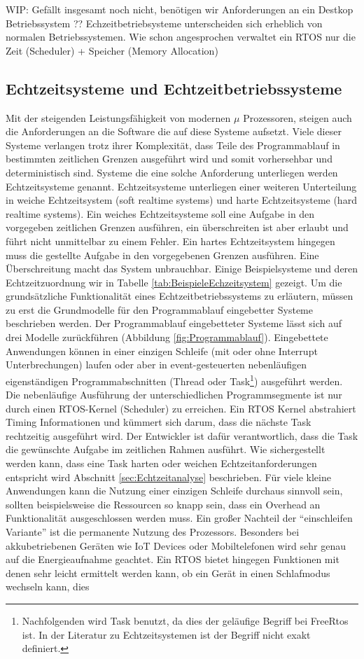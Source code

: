 \documentclass[ngerman]{seminarvorlage}
\begin{document}
WIP: Gefällt insgesamt noch nicht, benötigen wir Anforderungen an ein Destkop Betriebssystem ?? Echzeitbetriebsysteme unterscheiden sich erheblich von normalen Betriebssystemen. Wie schon angesprochen verwaltet ein RTOS nur die Zeit (Scheduler) + Speicher (Memory Allocation) 

\subsection{Echtzeitsysteme und Echtzeitbetriebssysteme}
Mit der steigenden Leistungsfähigkeit von modernen $\mu$ Prozessoren, steigen auch die Anforderungen an die Software die auf diese Systeme aufsetzt. Viele dieser Systeme verlangen trotz ihrer Komplexität, dass Teile des Programmablauf in bestimmten zeitlichen Grenzen ausgeführt wird und somit vorhersehbar und deterministisch sind. Systeme die eine solche Anforderung unterliegen werden Echtzeitsysteme genannt. Echtzeitsysteme unterliegen einer weiteren Unterteilung in weiche Echtzeitsystem (soft realtime systems) und harte Echtzeitsysteme (hard realtime systems). Ein weiches Echtzeitsysteme soll eine Aufgabe in den vorgegeben zeitlichen Grenzen ausführen, ein über\-schreiten ist aber erlaubt und führt nicht unmittelbar zu einem Fehler. Ein hartes Echtzeitsystem hingegen muss die gestellte Aufgabe in den vorgegebenen Grenzen ausführen. Eine Überschreitung macht das System unbrauchbar. Einige Beispielsysteme und deren Echtzeitzuordnung wir in Tabelle \ref{tab:BeispieleEchzeitsystem} gezeigt. Um die grundsätzliche Funktionalität eines Echtzeitbetriebssystems zu erläutern, müssen zu erst die Grundmodelle für den Programmablauf eingebetter Systeme beschrieben werden. Der Programmablauf eingebetteter Systeme lässt sich auf drei Modelle zurückführen (Abbildung \ref{fig:Programmablauf}). Eingebettete Anwendungen können in einer einzigen Schleife (mit oder ohne Interrupt Unterbrechungen) laufen oder aber in event-gesteuerten nebenläufigen eigenständigen Programmabschnitten (Thread oder Task\footnote{Nachfolgenden wird Task benutzt, da dies der geläufige Begriff bei FreeRtos ist. In der Literatur zu Echtzeitsystemen ist der Begriff nicht exakt definiert.}) ausgeführt werden. Die nebenläufige Ausführung der unterschiedlichen Programmsegmente ist nur durch einen RTOS-Kernel (Scheduler) zu erreichen. Ein RTOS Kernel abstrahiert Timing Informationen und kümmert sich darum, dass die nächste Task rechtzeitig ausgeführt wird. Der Entwickler ist dafür verantwortlich, dass die Task die gewünschte Aufgabe im zeitlichen Rahmen ausführt. Wie sichergestellt werden kann, dass eine Task  harten oder weichen Echtzeitanforderungen entspricht wird Abschnitt \ref{sec:Echtzeitanalyse} beschrieben. Für viele kleine Anwendungen kann die Nutzung einer einzigen Schleife durchaus sinnvoll sein, sollten beispielsweise die Ressourcen so knapp sein, dass ein Overhead an Funktionalität ausgeschlossen werden muss. Ein großer Nachteil der "`einschleifen Variante"' ist die permanente Nutzung des Prozessors. Besonders bei akkubetriebenen Geräten wie IoT Devices oder Mobiltelefonen wird sehr genau auf die Energieaufnahme geachtet. Ein RTOS bietet hingegen Funktionen mit denen sehr leicht ermittelt werden kann, ob ein Gerät in einen Schlafmodus wechseln kann, dies 
\end{document}
